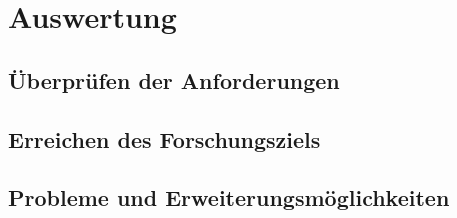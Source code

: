 %
\chapter{Auswertung}

\section{Überprüfen der Anforderungen}

\section{Erreichen des Forschungsziels}

\section{Probleme und Erweiterungsmöglichkeiten}
